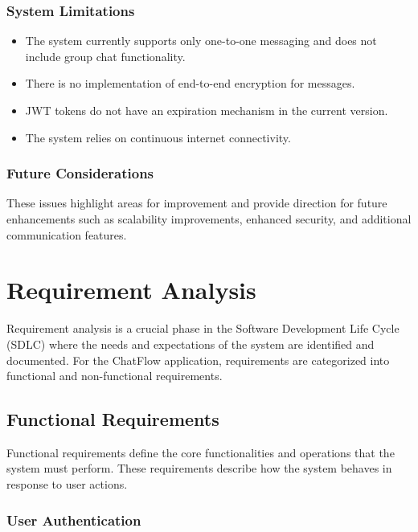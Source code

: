 \documentclass[12pt,a4paper]{report}
\begin{document}
\subsection{System Limitations}

\begin{itemize}
    \item The system currently supports only one-to-one messaging and does not include group chat functionality.
    \item There is no implementation of end-to-end encryption for messages.
    \item JWT tokens do not have an expiration mechanism in the current version.
    \item The system relies on continuous internet connectivity.
\end{itemize}

\subsection{Future Considerations}

These issues highlight areas for improvement and provide direction for future enhancements such as scalability improvements, enhanced security, and additional communication features.

\chapter{Requirement Analysis}

Requirement analysis is a crucial phase in the Software Development Life Cycle (SDLC) where the needs and expectations of the system are identified and documented. For the ChatFlow application, requirements are categorized into functional and non-functional requirements.

\section{Functional Requirements}

Functional requirements define the core functionalities and operations that the system must perform. These requirements describe how the system behaves in response to user actions.

\subsection{User Authentication}
\end{document}
